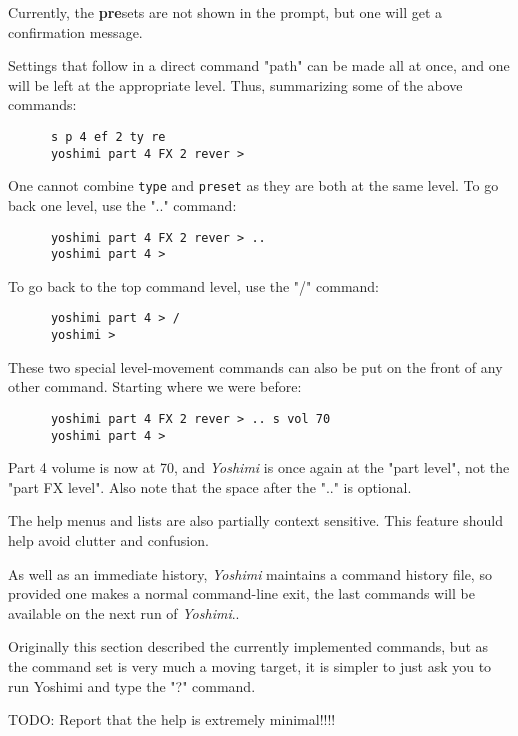    Currently, the \textbf{pre}sets are not shown in the prompt, but one
   will get a confirmation message.

   Settings that follow in a direct command "path"
   can be made all at once, and one will be left at the appropriate level.
   Thus, summarizing some of the above commands:

   \begin{verbatim}
      s p 4 ef 2 ty re
      yoshimi part 4 FX 2 rever >
   \end{verbatim}

   One cannot combine \texttt{type} and \texttt{preset} as they
   are both at the same level.  To go back one level, use the
   ".." command:

   \begin{verbatim}
      yoshimi part 4 FX 2 rever > ..
      yoshimi part 4 >
   \end{verbatim}

   To go back to the top command level, use the "/" command:

   \begin{verbatim}
      yoshimi part 4 > /
      yoshimi >
   \end{verbatim}

   These two special level-movement commands can also be put on the front of
   any other command.  Starting where we were before:

   \begin{verbatim}
      yoshimi part 4 FX 2 rever > .. s vol 70
      yoshimi part 4 >
   \end{verbatim}

   Part 4 volume is now at 70, and \textsl{Yoshimi} is once again at the
   "part level", not the "part FX level".  Also note that the space after
   the ".." is optional.

   The help menus and lists are also partially context sensitive. This
   feature should help avoid clutter and confusion.

   As well as an immediate history, \textsl{Yoshimi} maintains a command
   history file, so provided one makes a normal command-line exit, the last
   commands will be available on the next run of \textsl{Yoshimi}..

   Originally this section described the currently implemented commands,
   but as the command set is very much a moving target, it is simpler to just
   ask you to run Yoshimi and type the "?" command.

   TODO: Report that the help is extremely minimal!!!!

